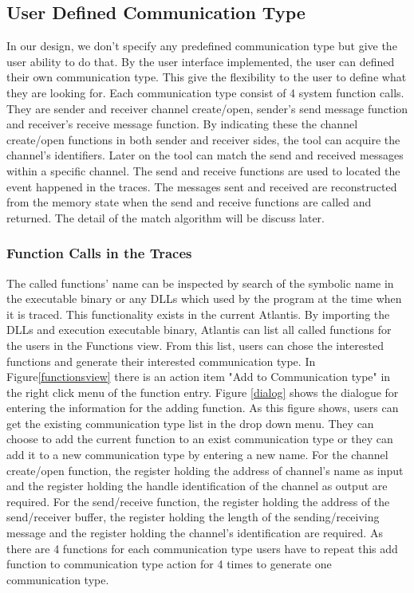 \documentclass[paper=a4, fontsize=11pt]{scrartcl}
\numberwithin{equation}{section}		%
\numberwithin{figure}{section}			%
\numberwithin{table}{section}				%
\begin{document}
\subsection{User Defined Communication Type}
In our design, we don't specify any predefined communication type but give the user ability to do that. By the user interface implemented, the user can defined their own communication type. This give the flexibility to the user to define what they are looking for. Each communication type consist of 4 system function calls. They are sender and receiver channel create/open, sender's send message function and receiver's receive message function. By indicating these the channel create/open functions in both sender and receiver sides, the tool can acquire the channel's identifiers. Later on the tool can match the send and received messages within a specific channel. The send and receive functions are used to located the event happened in the traces. The messages sent and received are reconstructed from the memory state when the send and receive functions are called and returned. The detail of the match algorithm will be discuss later.

\subsubsection{Function Calls in the Traces}
The called functions' name can be inspected  by  search of the symbolic name in the executable binary or any DLLs which used by the program at the time when it is traced. This functionality exists in the current Atlantis. By importing the DLLs and execution  executable binary, Atlantis can list all called functions for the users in the Functions view. From this list, users can chose the interested functions and generate their interested communication type. In Figure\ref{functionsview} there is  an action item "Add to Communication type" in the right click menu of the function entry. Figure \ref{dialog} shows the dialogue for entering the information for the adding function. As this figure shows, users can get the existing communication type list in the drop down menu. They can choose to add the current function to an exist communication type or they can add it to a new communication type by entering a new name. For the channel create/open function, the register holding the address of channel's name as input and the register holding the handle identification of the channel as output are required. For the send/receive function, the register holding the address of the send/receiver buffer, the register holding the length of the sending/receiving message and the register holding the channel's identification are required. As there are 4 functions for each communication type users have to repeat this add function to communication type action for 4 times to generate one communication type.
\end{document}
